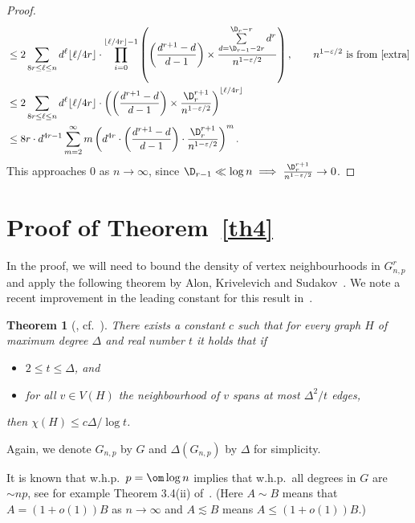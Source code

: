 \documentclass[12pt,a4paper]{article}
\def\e{\varepsilon} \def\f{\phi} \def\F{{\Phi}} \def\vp{\varphi} \def\g{\gamma}
\newtheorem{theorem}{Theorem}
\newcommand{\brac}[1]{\left(#1\right)}
\newcommand{\rai}{\rightarrow \infty}
\newcommand{\ra}{\rightarrow}
\def\Dr{\D_{r-1}}
\theoremstyle{plain}
\begin{document}
\begin{proof}
\begin{align*}
		&\leq2 \sum_{8r\leq \ell \leq n} d^{\ell} \lfloor \ell/4r\rfloor \cdot 
		\prod_{i=0}^{\lfloor \ell/4r \rfloor-1} \left(\brac{\frac{d^{r+1}-d}{d-1}} \times \frac{\sum\limits_{d = \Dr-2r}^{\D_r-r} d^r}{n^{1-\e/2}} \right),\qquad\text{$n^{1-\e/2}$ is from~\eqref{extra}}\\
		&\leq 2\sum_{8r\leq \ell \leq n} d^{\ell} \lfloor \ell/4r\rfloor \cdot 
		\left( \brac{\frac{d^{r+1}-d}{d-1}}\times \frac{\D_r^{r+1}}{n^{1-\e/2}} \right)^{\lfloor \ell/4r\rfloor} \\
		&\leq 8r \cdot d^{4r-1} \sum_{m=2}^\infty m \left(d^{4r}\cdot\brac{\frac{d^{r+1}-d}{d-1}} \cdot \frac{\D_r^{r+1}}{n^{1-\e/2}} \right)^{m}.
	\end{align*}
This approaches 0 as $n\rai$, since $\Dr \ll \log n \implies \frac{\D_r^{r+1}}{n^{1-\e/2}} \ra 0$.
\end{proof}
\section{Proof of Theorem~\ref{th4}}\label{sec:maindense}
In the proof, we will need to bound the density of vertex neighbourhoods in $G_{n,p}^r$ and apply the following theorem by Alon, Krivelevich and Sudakov~\cite{AKS99}. We note a recent improvement in the leading constant for this result in~\cite{DKPS20+}. 
\begin{theorem}[\cite{AKS99}, cf.~\cite{DKPS20+}] \label{thm:sparsenbhd}
There exists a constant $c$ such that for every graph $H$ of maximum degree $\Delta$ and real number $t$ it holds that if
\begin{itemize}
    \item $2 \leq t \leq \Delta$, and
    \item for all $v \in V(H)$ the neighbourhood of $v$ spans at most $\Delta^2/t$ edges,
\end{itemize}
then $\chi(H) \leq c\Delta / \log t$.
\end{theorem} 
Again, we denote $G_{n, p}$ by $G$ and $\Delta(G_{n,p})$ by $\Delta$ for simplicity. 

It is known that w.h.p.~$p=\om\log n$ implies that w.h.p.~all degrees in $G$ are $\sim np$, see for example Theorem 3.4(ii) of~\cite{FrKa16}.  (Here $A\sim B$ means that $A=(1+o(1))B$ as $n\to \infty$ and $A\lesssim B$ means $A\leq (1+o(1))B$.) 
\end{document}
